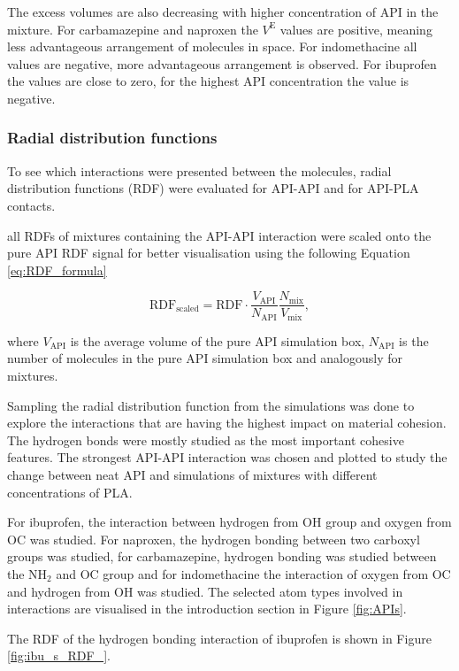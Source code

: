 The excess volumes are also decreasing with higher concentration of API in the mixture. For carbamazepine and naproxen the $V^\text{E}$ values are positive, meaning less advantageous arrangement of molecules in space. For indomethacine all values are negative, more advantageous arrangement is observed. For ibuprofen the values are close to zero, for the highest API concentration the value is negative.

\subsubsection{Radial distribution functions}

To see which interactions were presented between the molecules, radial distribution functions (RDF) were evaluated for API-API and for API-PLA contacts. 

all RDFs of mixtures containing the API-API interaction were scaled onto the pure API RDF signal for better visualisation using the following Equation \ref{eq:RDF_formula}

\begin{equation}\label{eq:RDF_formula}
	\text{RDF}_{\text{scaled}} = \text{RDF} \cdot \frac{V_{\text{API}}}{N_{\text{API}}} \frac{N_{\text{mix}}}{V_{\text{mix}}},
\end{equation}

where $V_{\text{API}}$ is the average volume of the pure API simulation box, $N_{\text{API}}$ is the number of molecules in the pure API simulation box and analogously for mixtures.

Sampling the radial distribution function from the simulations was done to explore the interactions that are having the highest impact on material cohesion. The hydrogen bonds were mostly studied as the most important cohesive features. The strongest API-API interaction was chosen and plotted to study the change between neat API and simulations of mixtures with different concentrations of PLA. 

For ibuprofen, the interaction between hydrogen from OH group and oxygen from OC was studied. For naproxen, the hydrogen bonding between two carboxyl groups was studied, for carbamazepine, hydrogen bonding was studied between the N$\text{H}_\text{2}$ and OC group and for indomethacine the interaction of oxygen from OC and hydrogen from OH was studied.  The selected atom types involved in interactions are visualised in the introduction section in Figure \ref{fig:APIs}. 

The RDF of the hydrogen bonding interaction of ibuprofen is shown in Figure \ref{fig:ibu_s_RDF_}.

